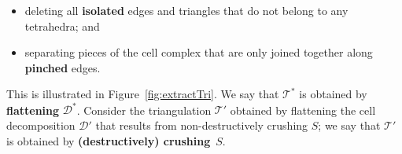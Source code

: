\documentclass[a4paper,UKenglish,cleveref, autoref, thm-restate]{lipics-v2021}
\newcommand{\tri}{\mathcal{T}}
\begin{document}
\begin{definition}
\begin{enumerate}
\begin{itemize}
        \item deleting all \textbf{isolated} edges and triangles that do not belong to any tetrahedra; and
        \item separating pieces of the cell complex that are only joined together along
        \textbf{pinched} edges.
    \end{itemize}
    This is illustrated in Figure~\ref{fig:extractTri}.
    We say that $\tri^\ast$ is obtained by \textbf{flattening} $\mathcal{D}^\ast$.
    Consider the triangulation $\tri'$ obtained by flattening
    the cell decomposition $\mathcal{D}'$ that results from non-destructively crushing $S$;
    we say that $\tri'$ is obtained by \textbf{(destructively) crushing}~$S$.
\qedhere
\end{enumerate}
\end{definition}
\end{document}
